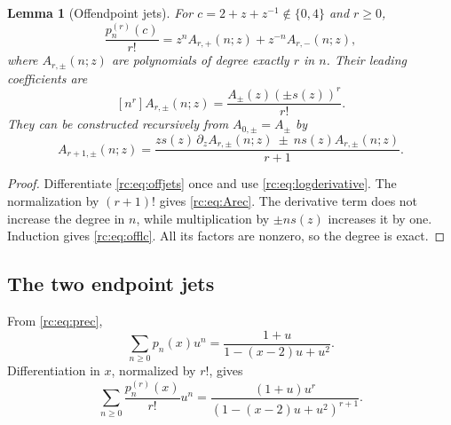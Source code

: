 \documentclass[11pt,a4paper]{article}
\numberwithin{equation}{section}
\newtheorem{lemma}[theorem]{Lemma}
\theoremstyle{definition}
\theoremstyle{remark}
\begin{document}
\begin{lemma}[Offendpoint jets]\label{rc:lem:offjets}
For $c=2+z+z^{-1}\notin\{0,4\}$ and $r\ge0$,
\begin{equation}\label{rc:eq:offjets}
 \frac{p_n^{(r)}(c)}{r!}
   =z^n A_{r,+}(n;z)+z^{-n}A_{r,-}(n;z),
\end{equation}
where $A_{r,\pm}(n;z)$ are polynomials of degree exactly $r$ in $n$.
Their leading coefficients are
\begin{equation}\label{rc:eq:offlc}
 [n^r]A_{r,\pm}(n;z)=\frac{A_\pm(z)(\pm s(z))^r}{r!}.
\end{equation}
They can be constructed recursively from $A_{0,\pm}=A_\pm$ by
\begin{equation}\label{rc:eq:Arec}
 A_{r+1,\pm}(n;z)=\frac{z s(z)\,\partial_z A_{r,\pm}(n;z)
                   \ \pm\ n s(z)A_{r,\pm}(n;z)}{r+1}.
\end{equation}
\end{lemma}
\begin{proof}
Differentiate \eqref{rc:eq:offjets} once and use \eqref{rc:eq:logderivative}.
The normalization by $(r+1)!$ gives \eqref{rc:eq:Arec}.  The derivative
term does not increase the degree in $n$, while multiplication by
$\pm ns(z)$ increases it by one.  Induction gives \eqref{rc:eq:offlc}.
All its factors are nonzero, so the degree is exact.
\end{proof}

\subsection{The two endpoint jets}
From \eqref{rc:eq:prec},
\begin{equation}\label{rc:eq:pGF}
 \sum_{n\ge0}p_n(x)u^n=\frac{1+u}{1-(x-2)u+u^2}.
\end{equation}
Differentiation in $x$, normalized by $r!$, gives
\begin{equation}\label{rc:eq:jetGF}
 \sum_{n\ge0}\frac{p_n^{(r)}(x)}{r!}u^n
       =\frac{(1+u)u^r}{(1-(x-2)u+u^2)^{r+1}}.
\end{equation}
\end{document}
